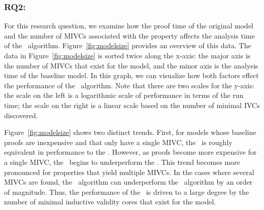 \vspace{0.1in}
\subsubsection{RQ2:} For this research question, we examine how the proof time of the original model and the number of MIVCs associated with the property affects the analysis time of the \aivcalg\ algorithm.  Figure~\ref{fig:modelsize} provides an overview of this data.  The data in Figure~\ref{fig:modelsize} is sorted twice along the x-axis: the major axis is the number of MIVCs that exist for the model, and the minor axis is the analysis time of the baseline model.  In this graph, we can visualize how both factors effect the performance of the \aivcalg\ algorithm.  Note that there are two scales for the y-axis: the scale on the left is a logarithmic scale of performance in terms of the run time; the scale on the right is a linear scale based on the number of minimal IVCs discovered.

Figure~\ref{fig:modelsize} shows two distinct trends.  First, for models whose baseline proofs are inexpensive and that only have a single MIVC, the \aivcalg\ is roughly equivalent in performance to the \ucbfalg.  However, as proofs become more expensive for a single MIVC, the \aivcalg\ begins to underperform the \ucbfalg.  This trend becomes more pronounced for properties that yield multiple MIVCs.  In the cases where several MIVCs are found, the \aivcalg\ algorithm can underperform the \ucbfalg\ algorithm by an order of magnitude.  Thus, the performance of the \aivcalg\ is driven to a large degree by the number of minimal inductive validity cores that exist for the model.




